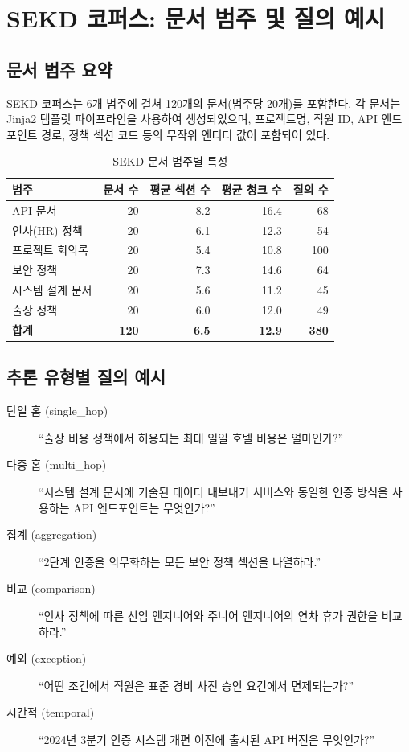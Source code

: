 \documentclass[12pt, a4paper, twoside]{report}
\begin{document}
\appendix

\chapter{SEKD 코퍼스: 문서 범주 및 질의 예시}
\label{app:sekd_ko}

\section{문서 범주 요약}

SEKD 코퍼스는 6개 범주에 걸쳐 120개의 문서(범주당 20개)를 포함한다. 각 문서는 Jinja2 템플릿 파이프라인을 사용하여 생성되었으며, 프로젝트명, 직원 ID, API 엔드포인트 경로, 정책 섹션 코드 등의 무작위 엔티티 값이 포함되어 있다.

\begin{table}[H]
\centering
\caption{SEKD 문서 범주별 특성}
\label{tab:app_categories_ko}
\begin{tabular}{lrrrr}
\toprule
\textbf{범주} & \textbf{문서 수} & \textbf{평균 섹션 수} & \textbf{평균 청크 수} & \textbf{질의 수} \\
\midrule
API 문서               & 20 & 8.2  & 16.4 & 68  \\
인사(HR) 정책           & 20 & 6.1  & 12.3 & 54  \\
프로젝트 회의록          & 20 & 5.4  & 10.8 & 100 \\
보안 정책               & 20 & 7.3  & 14.6 & 64  \\
시스템 설계 문서          & 20 & 5.6  & 11.2 & 45  \\
출장 정책               & 20 & 6.0  & 12.0 & 49  \\
\midrule
\textbf{합계}           & \textbf{120} & \textbf{6.5} & \textbf{12.9} & \textbf{380} \\
\bottomrule
\end{tabular}
\end{table}

\section{추론 유형별 질의 예시}

\begin{description}
    \item[단일 홉 (single\_hop)] ``출장 비용 정책에서 허용되는 최대 일일 호텔 비용은 얼마인가?''
    \item[다중 홉 (multi\_hop)] ``시스템 설계 문서에 기술된 데이터 내보내기 서비스와 동일한 인증 방식을 사용하는 API 엔드포인트는 무엇인가?''
    \item[집계 (aggregation)] ``2단계 인증을 의무화하는 모든 보안 정책 섹션을 나열하라.''
    \item[비교 (comparison)] ``인사 정책에 따른 선임 엔지니어와 주니어 엔지니어의 연차 휴가 권한을 비교하라.''
    \item[예외 (exception)] ``어떤 조건에서 직원은 표준 경비 사전 승인 요건에서 면제되는가?''
    \item[시간적 (temporal)] ``2024년 3분기 인증 시스템 개편 이전에 출시된 API 버전은 무엇인가?''
\end{description}
\end{document}

